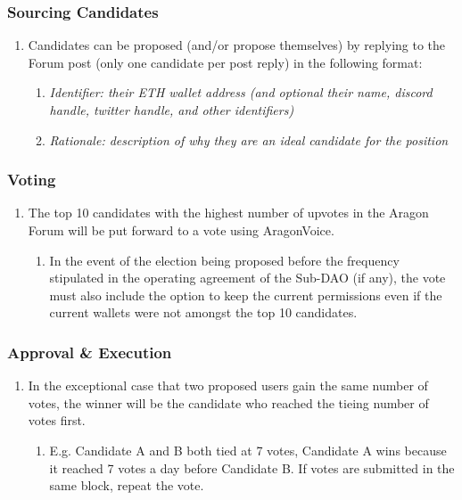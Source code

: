 \subsubsection*{Sourcing Candidates}
\begin{enumerate}
	\item Candidates can be proposed (and/or propose themselves) by replying to the Forum post (only one candidate per post reply) in the following format:
	\begin{enumerate}
		\item \textit{Identifier: their ETH wallet address (and optional their name, discord handle, twitter handle, and other identifiers)}
		\item \textit{Rationale: description of why they are an ideal candidate for the position}
	\end{enumerate}
\end{enumerate}


\subsubsection*{Voting}
\begin{enumerate}
	\item The top 10 candidates with the highest number of upvotes in the Aragon Forum will be put forward to a vote using \gls{AragonVoice}.
	\begin{enumerate}
		\item In the event of the election being proposed before the frequency stipulated in the operating agreement of the Sub-\ac{DAO} (if any), the vote must also include the option to keep the current permissions even if the current wallets were not amongst the top 10 candidates.
	\end{enumerate}
\end{enumerate}

\subsubsection*{Approval \& Execution}
\begin{enumerate}
	\item In the exceptional case that two proposed users gain the same number of votes, the winner will be the candidate who reached the tieing number of votes first.
	\begin{enumerate}
		\item E.g. Candidate A and B both tied at 7 votes, Candidate A wins because it reached 7 votes a day before Candidate B.
		If votes are submitted in the same block, repeat the vote.
	\end{enumerate}

\end{enumerate}


